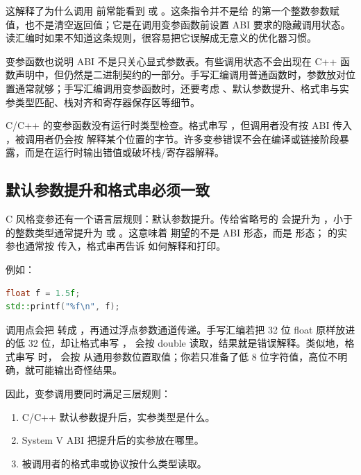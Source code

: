 这解释了为什么调用  前常能看到  或 。这条指令并不是给  的第一个整数参数赋值，也不是清空返回值；它是在调用变参函数前设置 ABI 要求的隐藏调用状态。读汇编时如果不知道这条规则，很容易把它误解成无意义的优化器习惯。

变参函数也说明 ABI 不是只关心显式参数表。有些调用状态不会出现在 C++ 函数声明中，但仍然是二进制契约的一部分。手写汇编调用普通函数时，参数放对位置通常就够；手写汇编调用变参函数时，还要考虑 、默认参数提升、格式串与实参类型匹配、栈对齐和寄存器保存区等细节。

\begin{warningbox}
C/C++ 的变参函数没有运行时类型检查。格式串写 ，但调用者没有按 ABI 传入 ，被调用者仍会按  解释某个位置的字节。许多变参错误不会在编译或链接阶段暴露，而是在运行时输出错值或破坏栈/寄存器解释。
\end{warningbox}

\subsection{默认参数提升和格式串必须一致}

C 风格变参还有一个语言层规则：默认参数提升。传给省略号的  会提升为 ，小于  的整数类型通常提升为  或 。这意味着  期望的不是  ABI 形态，而是  形态； 的实参也通常按  传入，格式串再告诉  如何解释和打印。

例如：

\begin{lstlisting}[language=C++]
float f = 1.5f;
std::printf("%f\n", f);
\end{lstlisting}

调用点会把  转成 ，再通过浮点参数通道传递。手写汇编若把 32 位 float 原样放进  的低 32 位，却让格式串写 ， 会按 double 读取，结果就是错误解释。类似地，格式串写  时， 会按  从通用参数位置取值；你若只准备了低 8 位字符值，高位不明确，就可能输出奇怪结果。

因此，变参调用要同时满足三层规则：

\begin{enumerate}
  \item C/C++ 默认参数提升后，实参类型是什么。
  \item System V ABI 把提升后的实参放在哪里。
  \item 被调用者的格式串或协议按什么类型读取。
\end{enumerate}

